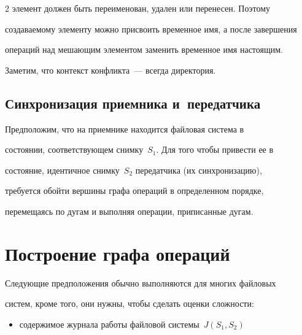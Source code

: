 \begin{multicols}{2}
элемент должен быть переименован, удален или перенесен. Поэтому 


создаваемому элементу можно присвоить временное имя, а после завершения 


операций над ме\-ша\-ющим элементом заменить временное имя настоящим. 


Заметим, что контекст конфликта~--- всегда директория.





\vspace*{-2pt}


\subsection{Синхронизация приемника и~передатчика}


\vspace*{-1pt}





      Предположим, что на приемнике находится файловая система в 


состоянии, соответствующем снимку~$S_1$. Для того чтобы привести ее в 


состояние, идентичное снимку~$S_2$ передатчика (их синхронизацию), 


требуется обойти вершины графа операций в определенном порядке, 


перемещаясь по дугам и выполняя операции, приписанные дугам.





\vspace*{-3pt}


\section{Построение графа операций}


\vspace*{-1pt}





      Следующие предположения обычно выполняются для многих файловых 


систем, кроме того, они нужны, чтобы сделать оценки сложности:  


      \begin{itemize}


\item содержимое журнала работы файловой системы~$J(S_1, S_2)$ 



\end{itemize}
\end{multicols}
